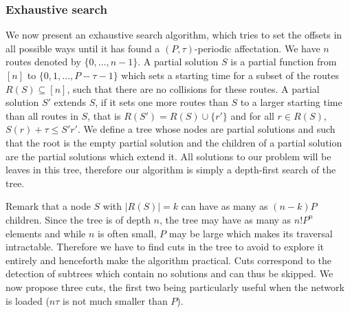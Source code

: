 \documentclass[a4paper,10pt]{article}
\begin{document}
	\subsubsection{Exhaustive search}
% 
% 

% 	    
      We now present an exhaustive search algorithm, which tries to set the offsets in all possible ways until it has found
      a $(P,\tau)$-periodic affectation. We have $n$ routes denoted by $\{0,\dots,n-1\}$. A partial solution $S$ is 
      a partial function from $[n]$ to $\{0,1,\dots,P-\tau -1\}$ which sets a starting time for a subset of the routes $R(S) \subseteq [n]$,
      such that there are no collisions for these routes.  A partial solution $S'$ extends $S$, if it sets one more routes than $S$ to a larger starting time than all routes in $S$, that is $R(S') = R(S) \cup \{r'\}$ and for all  $r \in R(S)$, $S(r) + \tau \leq S'{r'}$. We define a tree whose nodes are partial solutions and such that the root is the empty partial solution and 
      the children of a partial solution are the partial solutions which extend it. All solutions to our problem will be 
      leaves in this tree, therefore our algorithm is simply a depth-first search of the tree. 
      
      Remark that a node $S$ with $|R(S)| = k$ can have as many as $(n-k)P$ children. Since the tree is of depth $n$, the tree may have as many as $n!P^n$ elements and while $n$ is often small, $P$ may be large which makes its traversal intractable.  Therefore we have to find cuts in the tree to avoid to explore it entirely and henceforth make the algorithm practical. Cuts correspond to the detection of subtrees which contain no solutions and can thus be skipped.   
      We now propose three cuts, the first two being particularly useful when the network is loaded ($n\tau$ is not much smaller than $P$). 
      
\end{document}
